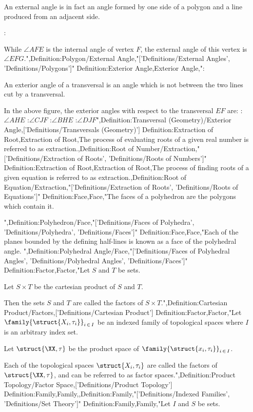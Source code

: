 An external angle is in fact an angle formed by one side of a polygon and a line produced from an adjacent side.

:

While $\angle AFE$ is the internal angle of vertex $F$, the external angle of this vertex is $\angle EFG$.",Definition:Polygon/External Angle,"['Definitions/External Angles', 'Definitions/Polygons']"
Definition:Exterior Angle,Exterior Angle,":


An exterior angle of a transversal is an angle which is not between the two lines cut by a transversal.

In the above figure, the exterior angles with respect to the transversal $EF$ are:
:$\angle AHE$
:$\angle CJF$
:$\angle BHE$
:$\angle DJF$",Definition:Transversal (Geometry)/Exterior Angle,['Definitions/Transversals (Geometry)']
Definition:Extraction of Root,Extraction of Root,The process of evaluating roots of a given real number is referred to as extraction.,Definition:Root of Number/Extraction,"['Definitions/Extraction of Roots', 'Definitions/Roots of Numbers']"
Definition:Extraction of Root,Extraction of Root,The process of finding roots of a given equation is referred to as extraction.,Definition:Root of Equation/Extraction,"['Definitions/Extraction of Roots', 'Definitions/Roots of Equations']"
Definition:Face,Face,"The faces of a polyhedron are the polygons which contain it.



",Definition:Polyhedron/Face,"['Definitions/Faces of Polyhedra', 'Definitions/Polyhedra', 'Definitions/Faces']"
Definition:Face,Face,"Each of the planes bounded by the defining half-lines is known as a face of the polyhedral angle.
",Definition:Polyhedral Angle/Face,"['Definitions/Faces of Polyhedral Angles', 'Definitions/Polyhedral Angles', 'Definitions/Faces']"
Definition:Factor,Factor,"Let $S$ and $T$ be sets.

Let $S \times T$ be the cartesian product of $S$ and $T$.


Then the sets $S$ and $T$ are called the factors of $S \times T$.",Definition:Cartesian Product/Factors,['Definitions/Cartesian Product']
Definition:Factor,Factor,"Let $\family {\struct {X_i, \tau_i} }_{i \mathop \in I}$ be an indexed family of topological spaces where $I$ is an arbitrary index set.

Let $\struct {\XX, \tau}$ be the product space of $\family {\struct {x_i, \tau_i} }_{i \mathop \in I}$.


Each of the topological spaces $\struct {X_i, \tau_i}$ are called the factors of $\struct {\XX, \tau}$, and can be referred to as factor spaces.",Definition:Product Topology/Factor Space,['Definitions/Product Topology']
Definition:Family,Family,,Definition:Family,"['Definitions/Indexed Families', 'Definitions/Set Theory']"
Definition:Family,Family,"Let $I$ and $S$ be sets.

